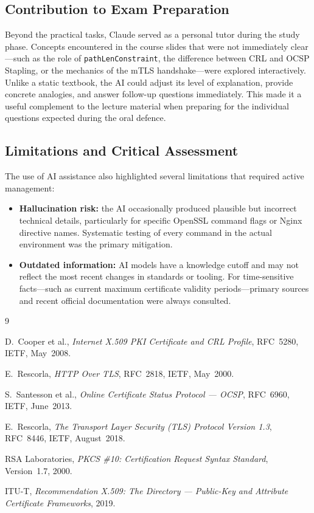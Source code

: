 \documentclass[10pt,twocolumn]{article}
\begin{document}
\subsection{Contribution to Exam Preparation}

Beyond the practical tasks, Claude served as a personal tutor during the
study phase. Concepts encountered in the course slides that were not
immediately clear---such as the role of \texttt{pathLenConstraint},
the difference between CRL and OCSP Stapling, or the mechanics of the
mTLS handshake---were explored interactively. Unlike a static textbook,
the AI could adjust its level of explanation, provide concrete analogies,
and answer follow-up questions immediately. This made it a useful complement
to the lecture material when preparing for the individual questions expected
during the oral defence.

\subsection{Limitations and Critical Assessment}

The use of AI assistance also highlighted several limitations that required
active management:

\begin{itemize}
  \item \textbf{Hallucination risk:} the AI occasionally produced plausible
        but incorrect technical details, particularly for specific OpenSSL
        command flags or Nginx directive names. Systematic testing of every
        command in the actual environment was the primary mitigation.
  \item \textbf{Outdated information:} AI models have a knowledge cutoff and
        may not reflect the most recent changes in standards or tooling.
        For time-sensitive facts---such as current maximum certificate
        validity periods---primary sources and recent official documentation
        were always consulted.
  
\end{itemize}


\begin{thebibliography}{9}

D.~Cooper et al.,
\textit{Internet X.509 PKI Certificate and CRL Profile},
RFC~5280, IETF, May~2008.

E.~Rescorla,
\textit{HTTP Over TLS},
RFC~2818, IETF, May~2000.

S.~Santesson et al.,
\textit{Online Certificate Status Protocol --- OCSP},
RFC~6960, IETF, June~2013.

E.~Rescorla,
\textit{The Transport Layer Security (TLS) Protocol Version 1.3},
RFC~8446, IETF, August~2018.

RSA Laboratories,
\textit{PKCS \#10: Certification Request Syntax Standard},
Version~1.7, 2000.

ITU-T,
\textit{Recommendation X.509: The Directory --- Public-Key and
Attribute Certificate Frameworks}, 2019.

\end{thebibliography}
\end{document}
